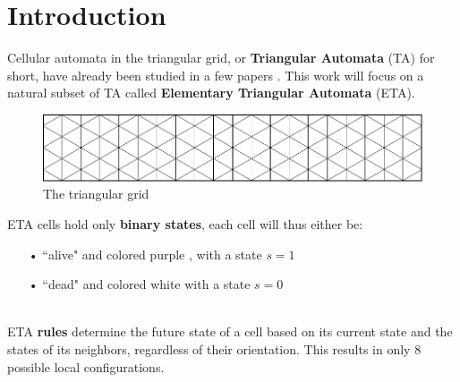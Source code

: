 \documentclass{article}
\begin{document}
\section{Introduction} \label{introduction}
Cellular automata in the triangular grid, or \textbf{Triangular Automata} (TA) for short, have already been studied in a few papers \cite{
gerlingClassificationTriangularHoneycomb1990,
baysCellularAutomataTriangular1994,
imaiComputationuniversalTwodimensional8state2000,
naumovGeneralizedCoordinatesCellular2003,
linApplicationUnstructuredCellular2009,
baysCellularAutomataTriangular2009,
baysGameLifeNonsquare2010,
zawidzkiApplicationSemitotalistic2D2011,
brecklingCellularAutomataEcological2011,
saadatCellularAutomataTriangular2016,
ortigozaACFUEGOSUnstructuredTriangular2016,
uguzStructureReversibility2D2017,
saadatCellularAutomataApproach2018,
wainerIntroductionCellularAutomata2019,
pavlovaUsingCellularAutomata2020,
saadatGeneratingPatternsTriangular2021,
saadatCopyMachinesSelfreproduction2023}. This work will focus on a natural subset of TA called \textbf{Elementary Triangular Automata} (ETA). 

\begin{figure}[H]
    \centering
    \includegraphics[width=.75\textwidth]{graphics/introduction/grid.pdf}
    \caption{The triangular grid}
    \label{fig:triangular-grid}
\end{figure}

\noindent ETA cells hold only \textbf{binary states}, each cell will thus either be:
\begin{enumerate}
    \item[•] ``alive" and colored purple , with a state $s=1$ 
    \item[•] ``dead" and colored white   with a state $s=0$
\end{enumerate}
\  \\
ETA \textbf{rules} determine the future state of a cell based on its current state and the states of its neighbors, regardless of their orientation. This results in only 8 possible local configurations.
\end{document}
